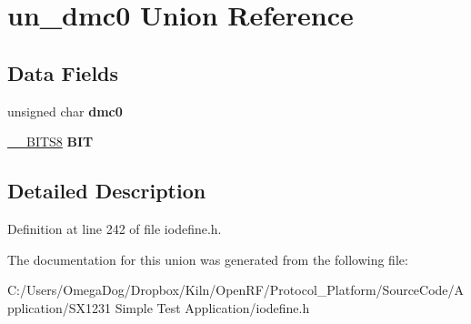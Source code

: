 \hypertarget{unionun__dmc0}{\section{un\-\_\-dmc0 Union Reference}
\label{unionun__dmc0}
}
\subsection*{Data Fields}
\begin{DoxyCompactItemize}
\item 
\hypertarget{unionun__dmc0_afa05ac7926e5d132b509e7ea8a2834de}{unsigned char {\bfseries dmc0}}\label{unionun__dmc0_afa05ac7926e5d132b509e7ea8a2834de}

\item 
\hypertarget{unionun__dmc0_ac7e7013f7b7b26c5b1b21a7757c948e1}{\hyperlink{struct_____b_i_t_s8}{\-\_\-\-\_\-\-B\-I\-T\-S8} {\bfseries B\-I\-T}}\label{unionun__dmc0_ac7e7013f7b7b26c5b1b21a7757c948e1}

\end{DoxyCompactItemize}


\subsection{Detailed Description}


Definition at line 242 of file iodefine.\-h.



The documentation for this union was generated from the following file\-:\begin{DoxyCompactItemize}
\item 
C\-:/\-Users/\-Omega\-Dog/\-Dropbox/\-Kiln/\-Open\-R\-F/\-Protocol\-\_\-\-Platform/\-Source\-Code/\-Application/\-S\-X1231 Simple Test Application/iodefine.\-h\end{DoxyCompactItemize}
